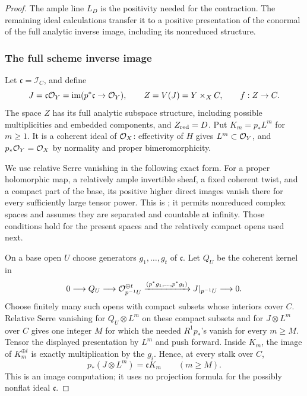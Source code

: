 \begin{proof}
The ample line \(L_D\) is the positivity needed for the contraction.
The remaining ideal calculations transfer it to a positive presentation
of the conormal of the full analytic inverse image, including its
nonreduced structure.

\subsubsection*{The full scheme inverse image}

Let \(\mathfrak c=\mathcal I_C\), and define
\begin{equation}\label{eq:null-full-inverse}
 J=\mathfrak c\mathcal O_Y=\operatorname{im}(p^*\mathfrak c\to\mathcal O_Y),\qquad
 Z=V(J)=Y\times_X C,\qquad f:Z\to C.
\end{equation}
The space \(Z\) has its full analytic subspace structure, including
possible multiplicities and embedded components, and \(Z_{\mathrm{red}}=D\).
Put \(K_m=p_*L^m\) for \(m\geq1\).  It is a coherent ideal of
\(\mathcal O_X\): effectivity of \(H\) gives \(L^m\subset\mathcal O_Y\), and
\(p_*\mathcal O_Y=\mathcal O_X\) by normality and proper bimeromorphicity.

We use relative Serre vanishing in the following exact form.  For a
proper holomorphic map, a relatively ample invertible sheaf, a fixed
coherent twist, and a compact part of the base, its positive higher
direct images vanish there for every sufficiently large tensor power.
This is \cite[Definitions~2.1--2.2 and Proposition~2.5]{Ancona1982};
it permits nonreduced complex spaces and assumes they are separated
and countable at infinity.  Those conditions hold for the present spaces and the
relatively compact opens used next.

On a base open \(U\) choose generators \(g_1,\ldots,g_t\) of
\(\mathfrak c\).  Let \(Q_U\) be the coherent kernel in
\[
 0\longrightarrow Q_U\longrightarrow\mathcal O_{p^{-1}U}^{\oplus t}
 \xrightarrow{(p^*g_1,\ldots,p^*g_t)}
 J|_{p^{-1}U}\longrightarrow0 .
\]
Choose finitely many such opens with compact subsets whose interiors
cover \(C\).  Relative Serre vanishing for
\(Q_U\otimes L^m\) on these compact subsets and for \(J\otimes L^m\)
over \(C\) gives one integer \(M\) for which the needed \(R^1p_*\)'s
vanish for every \(m\geq M\).  Tensor the displayed presentation by
\(L^m\) and push forward.  Inside \(K_m\), the image of \(K_m^{\oplus t}\)
is exactly multiplication by the \(g_i\).  Hence, at every stalk over
\(C\),
\begin{equation}\label{eq:null-ideal-product}
 p_*(J\otimes L^m)=\mathfrak cK_m\qquad(m\geq M).
\end{equation}
This is an image computation; it uses no projection formula for the
possibly nonflat ideal \(\mathfrak c\).


\end{proof}
